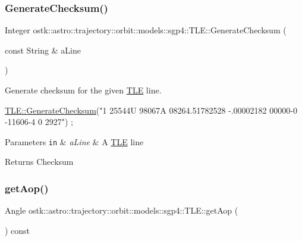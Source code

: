 \subsubsection{\texorpdfstring{Generate\+Checksum()}{GenerateChecksum()}}
{\footnotesize\ttfamily Integer ostk\+::astro\+::trajectory\+::orbit\+::models\+::sgp4\+::\+T\+L\+E\+::\+Generate\+Checksum (\begin{DoxyParamCaption}\item[{const String \&}]{a\+Line }\end{DoxyParamCaption})\hspace{0.3cm}{\ttfamily [static]}}



Generate checksum for the given \hyperlink{classostk_1_1astro_1_1trajectory_1_1orbit_1_1models_1_1sgp4_1_1_t_l_e}{T\+LE} line. 


\begin{DoxyCode}
\hyperlink{classostk_1_1astro_1_1trajectory_1_1orbit_1_1models_1_1sgp4_1_1_t_l_e_a4f9d8d752fc3700fd9bac043f106e19b}{TLE::GenerateChecksum}(\textcolor{stringliteral}{"1 25544U 98067A   08264.51782528 -.00002182  00000-0 -11606-4 0
        2927"}) ;
\end{DoxyCode}



\begin{DoxyParams}[1]{Parameters}
\mbox{\tt in}  & {\em a\+Line} & A \hyperlink{classostk_1_1astro_1_1trajectory_1_1orbit_1_1models_1_1sgp4_1_1_t_l_e}{T\+LE} line \\
\hline
\end{DoxyParams}
\begin{DoxyReturn}{Returns}
Checksum 
\end{DoxyReturn}
\mbox{\label{classostk_1_1astro_1_1trajectory_1_1orbit_1_1models_1_1sgp4_1_1_t_l_e_a8177e2bb63571a511e3e4ea2c853410c}} 
\subsubsection{\texorpdfstring{get\+Aop()}{getAop()}}
{\footnotesize\ttfamily Angle ostk\+::astro\+::trajectory\+::orbit\+::models\+::sgp4\+::\+T\+L\+E\+::get\+Aop (\begin{DoxyParamCaption}{ }\end{DoxyParamCaption}) const}



